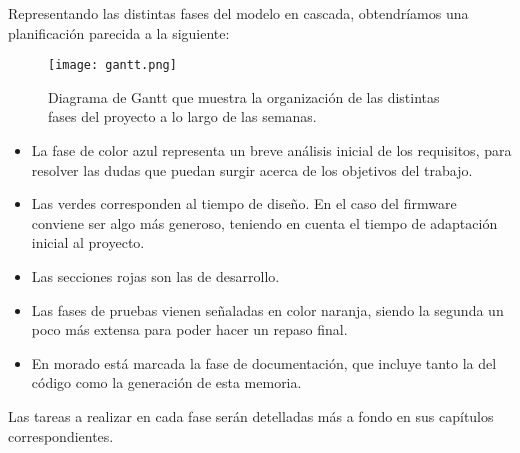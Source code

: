 Representando las distintas fases del modelo en cascada, obtendríamos una planificación parecida a la siguiente:

\begin{figure}[ht]
	\centering
	\texttt{[image: gantt.png]}
	\caption{Diagrama de Gantt que muestra la organización de las distintas fases del proyecto a lo largo de las semanas.}
\end{figure}

\begin{itemize}
    \item La fase de color azul representa un breve análisis inicial de los requisitos, para resolver las dudas que puedan surgir acerca de los objetivos del trabajo.
    \item Las verdes corresponden al tiempo de diseño. En el caso del firmware conviene ser algo más generoso, teniendo en cuenta el tiempo de adaptación inicial al proyecto.
    \item Las secciones rojas son las de desarrollo.
    \item Las fases de pruebas vienen señaladas en color naranja, siendo la segunda un poco más extensa para poder hacer un repaso final.
    \item En morado está marcada la fase de documentación, que incluye tanto la del código como la generación de esta memoria.
\end{itemize}

Las tareas a realizar en cada fase serán detelladas más a fondo en sus capítulos correspondientes.
